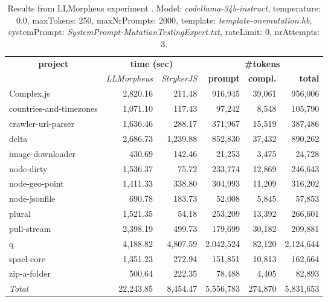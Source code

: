 
\begin{table*}[hbt!]
\centering
{\scriptsize
\begin{tabular}{l||r|r|r|r|r}
\multicolumn{1}{c|}{\bf project} & \multicolumn{2}{|c|}{\bf time (sec)} & \multicolumn{3}{|c|}{\bf \#tokens} \\
               & {\it LLMorpheus} & {\it StrykerJS} & {\bf prompt} & {\bf compl.} & {\bf total} \\
\hline
  Complex.js & 2,820.16 & 211.48 & 916,945 & 39,061 & 956,006 \\ 
countries-and-timezones & 1,071.10 & 117.43 & 97,242 & 8,548 & 105,790 \\ 
crawler-url-parser & 1,636.46 & 288.17 & 371,967 & 15,519 & 387,486 \\ 
delta & 2,686.73 & 1,239.88 & 852,830 & 37,432 & 890,262 \\ 
image-downloader & 430.69 & 142.46 & 21,253 & 3,475 & 24,728 \\ 
node-dirty & 1,536.37 & 75.72 & 233,774 & 12,869 & 246,643 \\ 
node-geo-point & 1,411.33 & 338.80 & 304,993 & 11,209 & 316,202 \\ 
node-jsonfile & 690.78 & 183.73 & 52,008 & 5,845 & 57,853 \\ 
plural & 1,521.35 & 54.18 & 253,209 & 13,392 & 266,601 \\ 
pull-stream & 2,398.19 & 499.73 & 179,699 & 30,182 & 209,881 \\ 
q & 4,188.82 & 4,807.59 & 2,042,524 & 82,120 & 2,124,644 \\ 
spacl-core & 1,351.23 & 272.94 & 151,851 & 10,813 & 162,664 \\ 
zip-a-folder & 500.64 & 222.35 & 78,488 & 4,405 & 82,893 \\ 
\hline
  \textit{Total} & 22,243.85 & 8,454.47 & 5,556,783 & 274,870 & 5,831,653 \\
  \end{tabular}
  }
  \\[2mm]
  \caption{Results from LLMorpheus experiment .
    Model: \textit{codellama-34b-instruct}, 
    temperature: 0.0, 
    maxTokens: 250, 
    maxNrPrompts: 2000, 
    template: \textit{template-onemutation.hb}, 
    systemPrompt: \textit{SystemPrompt-MutationTestingExpert.txt}, 
    rateLimit: 0, 
    nrAttempts: 3.  
  }
  \label{table:Cost:run369:codellama-34b-instruct:template-onemutation.hb:0.0}
\end{table*}